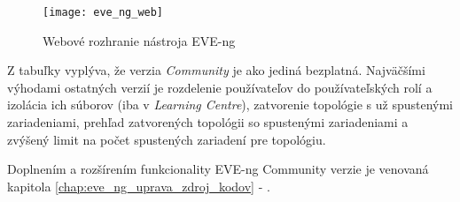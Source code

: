 \begin{figure}
    \centering
    \texttt{[image: eve\_ng\_web]}
    \caption{Webové rozhranie nástroja EVE-ng}
    \label{obr:eve_ng_web}
\end{figure}

Z tabuľky vyplýva, že verzia \emph{Community} je ako jediná bezplatná. Najväčšími výhodami ostatných verzií je rozdelenie používateľov do používateľských rolí a izolácia ich súborov (iba v \emph{Learning Centre}), zatvorenie topológie s už spustenými zariadeniami, prehľad zatvorených topológii so spustenými zariadeniami a zvýšený limit na počet spustených zariadení pre topológiu.

Doplnením a rozšírením funkcionality EVE-ng Community verzie je venovaná kapitola \ref{chap:eve_ng_uprava_zdroj_kodov} - .

\newpage

